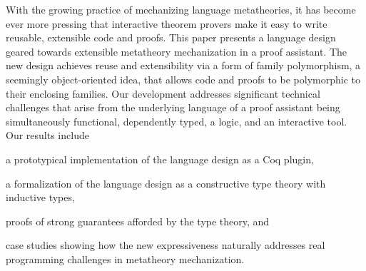 
With the growing practice of mechanizing language metatheories,
it has become ever more pressing that interactive theorem provers 
make it easy to write reusable, extensible code and proofs.
%
This paper presents a language design geared towards extensible metatheory
mechanization in a proof assistant.
The new design achieves reuse and extensibility via a form of family
polymorphism, a seemingly object-oriented idea, that allows code and
proofs to be polymorphic to their enclosing families.
Our development addresses significant technical challenges that arise
from the underlying language of a proof assistant being simultaneously
functional, dependently typed, a logic, and an interactive tool.
%
Our results include
\begin{enumerate*}
\item a prototypical implementation of the language design as a Coq plugin,
\item a formalization of the language design as a constructive type theory with inductive types,
\item proofs of strong guarantees afforded by the type theory,
and 
\item case studies showing how the new expressiveness naturally addresses real
programming challenges in metatheory mechanization.
\end{enumerate*}